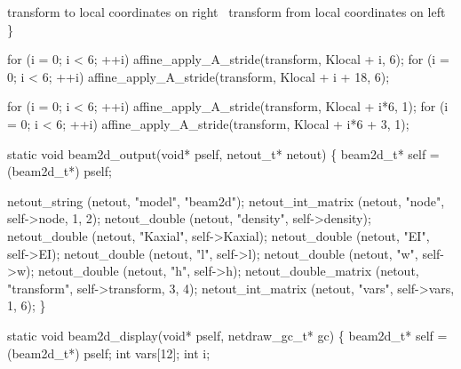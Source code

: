    \LA{}transform to local coordinates on right~{\nwtagstyle{}}\RA{}
    \LA{}transform from local coordinates on left~{\nwtagstyle{}}\RA{}
\}

\nwendcode{}\nwdocspar

\nwenddocs{}\endmoddef
for (i = 0; i < 6; ++i)
    affine_apply_A_stride(transform, Klocal + i,      6);
for (i = 0; i < 6; ++i)
    affine_apply_A_stride(transform, Klocal + i + 18, 6);
\nwendcode{}\nwdocspar

\nwenddocs{}\endmoddef
for (i = 0; i < 6; ++i)
    affine_apply_A_stride(transform, Klocal + i*6,     1);
for (i = 0; i < 6; ++i)
    affine_apply_A_stride(transform, Klocal + i*6 + 3, 1);
\nwendcode{}\nwdocspar


\nwenddocs{}\plusendmoddef
static void beam2d_output(void* pself, netout_t* netout)
\{
    beam2d_t* self = (beam2d_t*) pself;

    netout_string        (netout, "model",     "beam2d");
    netout_int_matrix    (netout, "node",      self->node, 1, 2);
    netout_double        (netout, "density",   self->density);
    netout_double        (netout, "Kaxial",    self->Kaxial);
    netout_double        (netout, "EI",        self->EI);
    netout_double        (netout, "l",         self->l);
    netout_double        (netout, "w",         self->w);
    netout_double        (netout, "h",         self->h);
    netout_double_matrix (netout, "transform", self->transform, 3, 4);
    netout_int_matrix    (netout, "vars",      self->vars, 1, 6);
\}

\nwendcode{}\nwdocspar

\nwenddocs{}\plusendmoddef
static void beam2d_display(void* pself, netdraw_gc_t* gc)
\{
    beam2d_t* self = (beam2d_t*) pself;
    int vars[12];
    int i;

